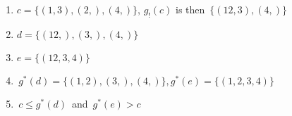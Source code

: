  \begin{enumerate}
    \item $c = \{(1, 3),(2,), (4,)\}$, $g_!(c)$ is then \,$\{(12,3),(4,)\}$\,
    \item $d = \{(12,),(3,),(4,)\}$
    \item $e = \{(12,3,4)\}$
    \item \,$g^*(d)=\{(1,2),(3,),(4,)\}, g^*(e)=\{(1,2,3,4)\}$\,
    \item \,$c \leq g^*(d)$\, and \,$g^*(e) > c$\,
  \end{enumerate}